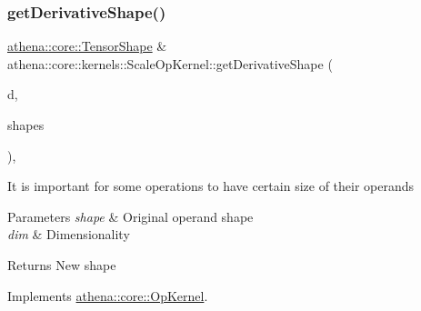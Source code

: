 \mbox{\label{classathena_1_1core_1_1kernels_1_1_scale_op_kernel_a7f9519bf17e1d70b56aa70cc49981470}} 
\subsubsection{\texorpdfstring{get\+Derivative\+Shape()}{getDerivativeShape()}}
{\footnotesize\ttfamily \mbox{\hyperlink{classathena_1_1core_1_1_tensor_shape}{athena\+::core\+::\+Tensor\+Shape}} \& athena\+::core\+::kernels\+::\+Scale\+Op\+Kernel\+::get\+Derivative\+Shape (\begin{DoxyParamCaption}\item[{int}]{d,  }\item[{const std\+::vector$<$ \mbox{\hyperlink{classathena_1_1core_1_1_tensor_shape}{athena\+::core\+::\+Tensor\+Shape}} \& $>$ \&}]{shapes }\end{DoxyParamCaption})\hspace{0.3cm}{\ttfamily [override]}, {\ttfamily [virtual]}}

It is important for some operations to have certain size of their operands 
\begin{DoxyParams}{Parameters}
{\em shape} & Original operand shape \\
\hline
{\em dim} & Dimensionality \\
\hline
\end{DoxyParams}
\begin{DoxyReturn}{Returns}
New shape 
\end{DoxyReturn}


Implements \mbox{\hyperlink{classathena_1_1core_1_1_op_kernel_aa2367d955810d4e0f3f27b85ae6fe85a}{athena\+::core\+::\+Op\+Kernel}}.

\mbox{\label{classathena_1_1core_1_1kernels_1_1_scale_op_kernel_a4f9e4fee100ed7f09840fa4b2d55f2bf}} 
